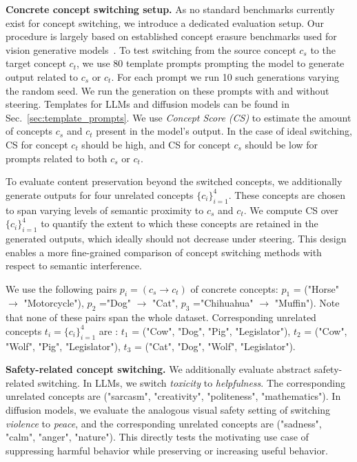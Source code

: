 \noindent \textbf{Concrete concept switching setup.}
As no standard benchmarks currently exist for concept switching, we introduce a dedicated evaluation setup. Our procedure is largely based on established concept erasure benchmarks used for vision generative models~\cite{one_dimentional_adapter_spm,wu2025unlearningconceptsdiffusionmodel}. 
To test switching from the source concept $c_s$ to the target concept $c_t$, we use 80 template prompts prompting the model to generate
output related to  $c_s$ or $c_t$. For each prompt we run 10 such generations varying the random seed. We run the generation on these prompts with and without steering. Templates for LLMs and diffusion models can be found in Sec.~\ref{sec:template_prompts}. We use \emph{Concept Score (CS)} to estimate the amount of concepts $c_s$ and $c_t$ present in the model’s output. 
In the case of ideal switching, CS for concept $c_t$ should be high, and CS for concept $c_s$ should be low for prompts related to both $c_s$ or $c_t$.

To evaluate content preservation beyond the switched concepts, we additionally generate outputs for four unrelated concepts $\{c_i\}_{i=1}^4$. These concepts are chosen to span varying levels of semantic proximity to $c_s$ and $c_t$. We compute CS over $\{c_i\}_{i=1}^4$ to quantify the extent to which these concepts are retained in the generated outputs, which ideally should not decrease under steering. This design enables a more fine-grained comparison of concept switching methods with respect to semantic interference. 

We use the following pairs $p_i = (c_s \to c_t)$ of concrete concepts: $p_1$ = ("Horse" $\to$ "Motorcycle"), $p_2$ ="Dog" $\to$ "Cat", $p_3$ ="Chihuahua" $\to$ "Muffin"). Note that none of these pairs span the whole dataset. Corresponding unrelated concepts $t_i = \{c_i\}^4_{i=1}$ are : $t_1$ = ("Cow",  "Dog", "Pig", "Legislator"), $t_2$ = ("Cow",  "Wolf", "Pig", "Legislator"), $t_3$ = ("Cat",  "Dog", "Wolf", "Legislator").  

\noindent \textbf{Safety-related concept switching.}
We additionally evaluate abstract safety-related switching. In LLMs, we switch \emph{toxicity} to \emph{helpfulness}. The corresponding unrelated concepts are ("sarcasm",  "creativity", "politeness", "mathematics"). 
In diffusion models, we evaluate the analogous
visual safety setting of switching \emph{violence} to \emph{peace}, and the corresponding unrelated concepts are ("sadness",  "calm", "anger", "nature"). This directly tests the motivating use case of suppressing harmful behavior while preserving or increasing useful behavior.  

